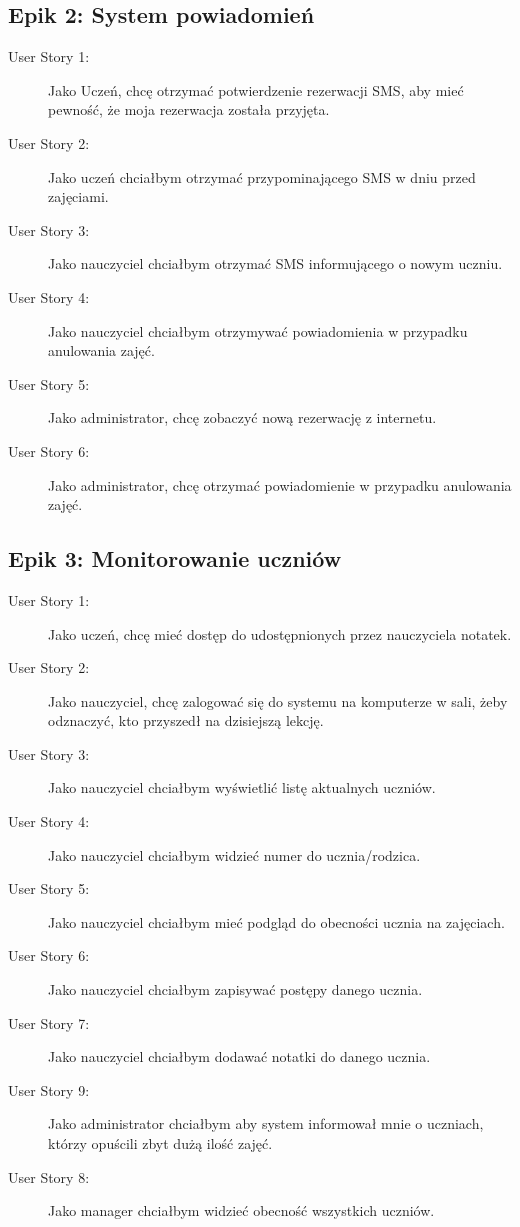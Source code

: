 \documentclass[12pt,a4paper]{article}
\begin{document}
\subsection{Epik 2: System powiadomień}
\begin{description}
    \item[User Story 1:] Jako Uczeń, chcę otrzymać potwierdzenie rezerwacji SMS, aby mieć pewność, że moja rezerwacja została przyjęta.
    \item[User Story 2:] Jako uczeń chciałbym otrzymać przypominającego SMS w dniu przed zajęciami.
    \item[User Story 3:] Jako nauczyciel chciałbym otrzymać SMS informującego o nowym uczniu.
    \item[User Story 4:] Jako nauczyciel chciałbym otrzymywać powiadomienia w przypadku anulowania zajęć.
    \item[User Story 5:] Jako administrator, chcę zobaczyć nową rezerwację z internetu.
    \item[User Story 6:] Jako administrator, chcę otrzymać powiadomienie w przypadku anulowania zajęć.
\end{description}
    
\subsection{Epik 3: Monitorowanie uczniów}
\begin{description}
	\item[User Story 1:] Jako uczeń, chcę mieć dostęp do udostępnionych przez nauczyciela notatek.
    \item[User Story 2:] Jako nauczyciel, chcę zalogować się do systemu na komputerze w sali, żeby odznaczyć, kto przyszedł na dzisiejszą lekcję.
    \item[User Story 3:] Jako nauczyciel chciałbym wyświetlić listę aktualnych uczniów.
    \item[User Story 4:] Jako nauczyciel chciałbym widzieć numer do ucznia/rodzica.
    \item[User Story 5:] Jako nauczyciel chciałbym mieć podgląd do obecności ucznia na zajęciach.
    \item[User Story 6:] Jako nauczyciel chciałbym zapisywać postępy danego ucznia.
    \item[User Story 7:] Jako nauczyciel chciałbym dodawać notatki do danego ucznia.
     \item[User Story 9:] Jako administrator chciałbym aby system informował mnie o uczniach, którzy opuścili zbyt dużą ilość zajęć.
    \item[User Story 8:] Jako manager chciałbym widzieć obecność wszystkich uczniów.
   
\end{description}
\end{document}

